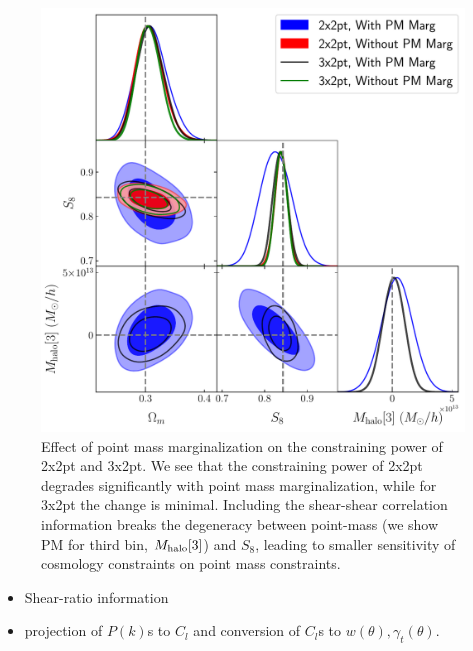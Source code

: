 \documentclass[fleqn,usenatbib]{mnras}
\begin{document}
    \begin{figure}
    \includegraphics[width=\columnwidth]{figs/compare_cosmo_pm_marg_2x2pt_3x2pt_fullspace.pdf}
    \caption[]{Effect of point mass marginalization on the constraining power of 2x2pt and 3x2pt. We see that the constraining power of 2x2pt degrades significantly with point mass marginalization, while for 3x2pt the change is minimal. Including the shear-shear correlation information breaks the degeneracy between point-mass (we show PM for third bin, $M_{\rm halo}[3]$) and $S_8$, leading to smaller sensitivity of cosmology constraints on point mass constraints. }
    \label{fig:pm_effect}
    \end{figure}
\begin{itemize}
    \item Shear-ratio information
    \item projection of $P(k)$s to $C_l$ and conversion of $C_l$s to $w(\theta),\gamma_t(\theta)$.
\end{itemize}

\end{document}
